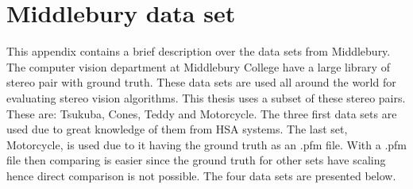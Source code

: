 \chapter{Middlebury data set}\label{app:middlebury}
This appendix contains a brief description over the data sets from Middlebury. The computer vision department at Middlebury College have a large library of stereo pair with ground truth\cite{middlebury2016}. These data sets are used all around the world for evaluating stereo vision algorithms. This thesis uses a subset of these stereo pairs. \\
These are: Tsukuba, Cones, Teddy and Motorcycle. The three first data sets are used due to great knowledge of them from HSA systems. The last set, Motorcycle, is used due to it having the ground truth as an .pfm file. With a .pfm file then comparing is easier since the ground truth for other sets have scaling hence direct comparison is not possible. The four data sets are presented below.\\

